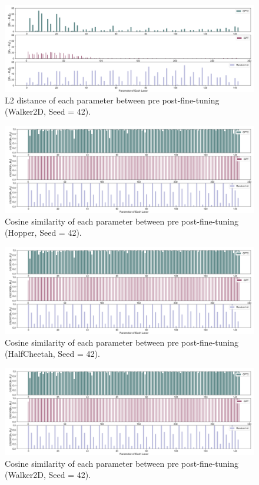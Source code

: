 \documentclass{article}
\begin{document}
\begin{figure}[H]
    \centering
        \includegraphics[width=\linewidth]{figs/paramdist_0_40_gpt2_igpt_dt_walker2d_medium_42.pdf}
    \caption{L2 distance of each parameter between pre post-fine-tuning (Walker2D, Seed = 42).}
\end{figure}

\begin{figure}[H]
    \centering
        \includegraphics[width=\linewidth]{figs/paramcos_0_40_gpt2_igpt_dt_hopper_medium_42.pdf}
    \caption{Cosine similarity of each parameter between pre post-fine-tuning (Hopper, Seed = 42).}
\end{figure}

\begin{figure}[H]
    \centering
        \includegraphics[width=\linewidth]{figs/paramcos_0_40_gpt2_igpt_dt_halfcheetah_medium_42.pdf}
    \caption{Cosine similarity of each parameter between pre post-fine-tuning (HalfCheetah, Seed = 42).}
\end{figure}

\begin{figure}[H]
    \centering
        \includegraphics[width=\linewidth]{figs/paramcos_0_40_gpt2_igpt_dt_walker2d_medium_42.pdf}
    \caption{Cosine similarity of each parameter between pre post-fine-tuning (Walker2D, Seed = 42).}
\end{figure}
\end{document}
